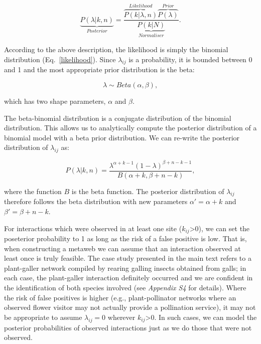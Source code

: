 \documentclass[12pt]{article}
\begin{document}
    \begin{equation}
      \underbrace{P(\lambda|k,n)}_{Posterior} = \frac{\overbrace{P(k|\lambda,n)}^{Likelihood}\overbrace{P(\lambda)}^{Prior}}{\underbrace{P(k|N)}_{Normaliser}} .
      \label{posterior}
    \end{equation}

    According to the above description, the likelihood is simply the binomial distribution (Eq.~\ref{likelihood}). Since $\lambda_{ij}$ is a probability, it is bounded between 0 and 1 and the most appropriate prior distribution is the beta:

    \begin{equation}
      \lambda \sim Beta(\alpha,\beta) , \label{prior}
    \end{equation}

    \noindent which has two shape parameters, $\alpha$ and $\beta$. 

   The beta-binomial distribution is a conjugate distribution of the binomial distribution. This allows us to analytically compute the posterior distribution of a binomial model with a beta prior distribution. We can re-write the posterior distribution of $\lambda_{ij}$ as:

    \begin{equation}
      P(\lambda|k,n) = \frac{\lambda^{\alpha+k-1}(1-\lambda)^{\beta+n-k-1}}{B(\alpha+k,\beta+n-k)} , \label{posterior2}
    \end{equation}

    
    \noindent where the function $B$ is the beta function. The posterior distribution of $\lambda_{ij}$ therefore follows the beta distribution with new parameters $\alpha'= \alpha+k$ and $\beta'=\beta+n-k$. 


    For interactions which were observed in at least one site ($k_{ij}$\textgreater$0$), we can set the poseterior probability to 1 as long as the risk of a false positive is low. That is, when constructing a metaweb we can assume that an interaction observed at least once is truly feasible. The case study presented in the main text refers to a plant-galler network compiled by rearing galling insects obtained from galls; in each case, the plant-galler interaction definitely occurred and we are confident in the identification of both species involved (see \emph{Appendix S4} for details). Where the risk of false positives is higher (e.g., plant-pollinator networks where an observed flower visitor may not actually provide a pollination service), it may not be appropriate to assume $\lambda_{ij}=0$ wherever $k_{ij}$\textgreater$0$. In such cases, we can model the posterior probabilities of observed interactions just as we do those that were not observed.
\end{document}
